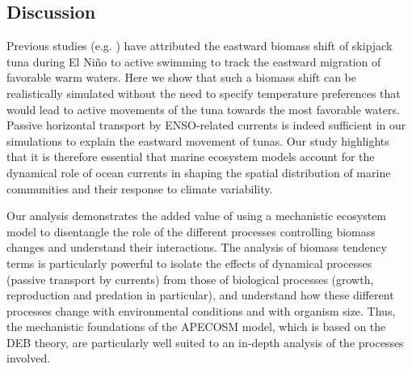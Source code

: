 
\subsection{Discussion}

Previous studies (e.g. \citealp{lehodeyNinoSouthernOscillation1997, lehodeyPelagicEcosystemTropical2001}) have attributed the eastward biomass shift of skipjack tuna during El Niño to active swimming to track the eastward migration of favorable warm waters. Here we show that such a biomass shift can be realistically simulated without the need to specify temperature preferences that would lead to active movements of the tuna towards the most favorable waters. Passive horizontal transport by ENSO-related currents is indeed sufficient in our simulations to explain the eastward movement of tunas. Our study highlights that it is therefore essential that marine ecosystem models account for the dynamical role of ocean currents in shaping the spatial distribution of marine communities and their response to climate variability.

Our analysis demonstrates the added value of using a mechanistic ecosystem model to disentangle the role of the different processes controlling biomass changes and understand their interactions. The analysis of biomass tendency terms is particularly powerful to isolate the effects of dynamical processes (passive transport by currents) from those of biological processes (growth, reproduction and predation in particular), and understand how these different processes change with environmental conditions and with organism size. Thus, the mechanistic foundations of the APECOSM model, which is based on the DEB theory, are particularly well suited to an in-depth analysis of the processes involved.

